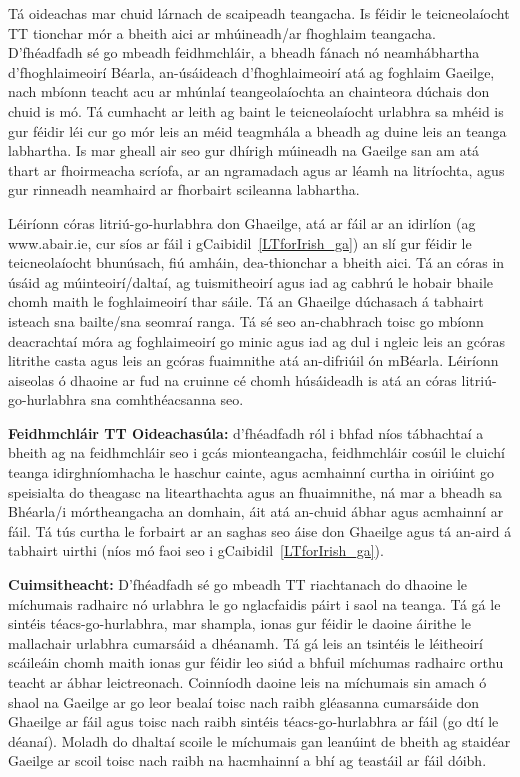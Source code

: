 \begin{multicols}{2}
Tá oideachas mar chuid lárnach de scaipeadh teangacha. Is féidir le teicneolaíocht TT tionchar mór a bheith aici ar mhúineadh/ar fhoghlaim teangacha. D’fhéadfadh sé go mbeadh feidhmchláir, a bheadh fánach nó neamhábhartha d’fhoghlaimeoirí Béarla, an-úsáideach d’fhoghlaimeoirí atá ag foghlaim Gaeilge, nach mbíonn teacht acu ar mhúnlaí teangeolaíochta an chainteora dúchais don chuid is mó. Tá cumhacht ar leith ag baint le teicneolaíocht urlabhra sa mhéid is gur féidir léi cur go mór leis an méid teagmhála a bheadh ag duine leis an teanga labhartha. Is mar gheall air seo gur dhírigh múineadh na Gaeilge san am atá thart ar fhoirmeacha scríofa, ar an ngramadach agus ar léamh na litríochta, agus gur rinneadh neamhaird ar fhorbairt scileanna labhartha.

Léiríonn córas litriú-go-hurlabhra don Ghaeilge, atá ar fáil ar an idirlíon (ag www.abair.ie, cur síos ar fáil i gCaibidil~\ref{LTforIrish_ga}) an slí gur féidir le teicneolaíocht bhunúsach, fiú amháin, dea-thionchar a bheith aici. Tá an córas in úsáid ag múinteoirí/daltaí, ag tuismitheoirí agus iad ag cabhrú le hobair bhaile chomh maith le foghlaimeoirí thar sáile. Tá an Ghaeilge dúchasach á tabhairt isteach sna bailte/sna seomraí ranga. Tá sé seo an-chabhrach toisc go mbíonn deacrachtaí móra ag foghlaimeoirí go minic agus iad ag dul i ngleic leis an gcóras litrithe casta agus leis an gcóras fuaimnithe atá an-difriúil ón mBéarla. Léiríonn aiseolas ó dhaoine ar fud na cruinne cé chomh húsáideadh is atá an córas litriú-go-hurlabhra sna comhthéacsanna seo.

\textbf{Feidhmchláir TT Oideachasúla:} d’fhéadfadh ról i bhfad níos tábhachtaí a bheith ag na feidhmchláir seo i gcás mionteangacha, feidhmchláir cosúil le cluichí teanga idirghníomhacha le haschur cainte, agus acmhainní curtha in oiriúint go speisialta do theagasc na litearthachta agus an fhuaimnithe, ná mar a bheadh sa Bhéarla/i mórtheangacha an domhain, áit atá an-chuid ábhar agus acmhainní ar fáil. Tá tús curtha le forbairt ar an saghas seo áise don Ghaeilge agus tá an-aird á tabhairt uirthi (níos mó faoi seo i gCaibidil~\ref{LTforIrish_ga}).

\textbf {Cuimsitheacht:} D’fhéadfadh sé go mbeadh TT riachtanach do dhaoine le míchumais radhairc nó urlabhra le go nglacfaidis páirt i saol na teanga. Tá gá le sintéis téacs-go-hurlabhra, mar shampla, ionas gur féidir le daoine áirithe le mallachair urlabhra cumarsáid a dhéanamh. Tá gá leis an tsintéis le léitheoirí scáileáin chomh maith ionas gur féidir leo siúd a bhfuil míchumas radhairc orthu teacht ar ábhar leictreonach. Coinníodh daoine leis na míchumais sin amach ó shaol na Gaeilge ar go leor bealaí toisc nach raibh gléasanna cumarsáide don Ghaeilge ar fáil agus toisc nach raibh sintéis téacs-go-hurlabhra ar fáil (go dtí le déanaí). Moladh do dhaltaí scoile le míchumais gan leanúint de bheith ag staidéar Gaeilge ar scoil toisc nach raibh na hacmhainní a bhí ag teastáil ar fáil dóibh.


\end{multicols}
